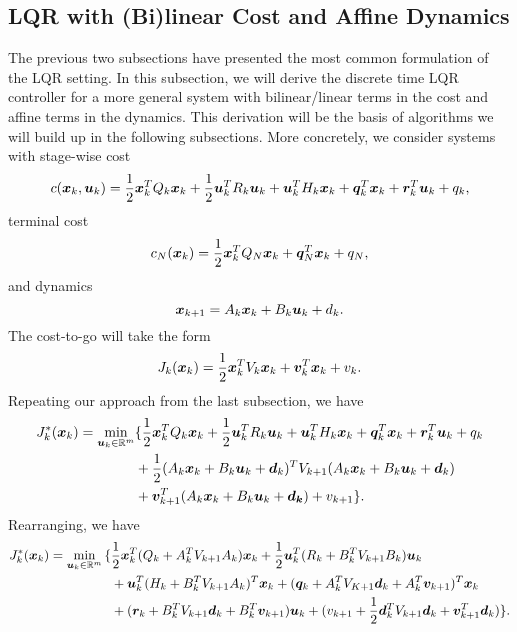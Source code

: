 \subsection{LQR with (Bi)linear Cost and Affine Dynamics}

The previous two subsections have presented the most common formulation of the LQR setting. In this subsection, we will derive the discrete time LQR controller for a more general system with bilinear/linear terms in the cost and affine terms in the dynamics. This derivation will be the basis of algorithms we will build up in the following subsections. More concretely, we consider systems with stage-wise cost
\begin{equation}
    c(\bm{x}_k, \bm{u}_k) = \frac{1}{2} \bm{x}_k^T Q_k \bm{x}_k + \frac{1}{2} \bm{u}_k^T R_k \bm{u}_k + \bm{u}_k^T H_k \bm{x}_k +\bm{q}_k^T \bm{x}_k + \bm{r}^T_k \bm{u}_k + q_k,
\end{equation}
terminal cost
\begin{equation}
    c_N(\bm{x}_k) = \frac{1}{2} \bm{x}_k^T Q_N \bm{x}_k + \bm{q}_N^T \bm{x}_k + q_N,
\end{equation}
and dynamics
\begin{equation}
    \bm{x}_{k+1} = A_k \bm{x}_k + B_k \bm{u}_k + d_k.
\end{equation}
The cost-to-go will take the form 
\begin{equation}
    J_k(\bm{x}_k) = \frac{1}{2}\bm{x}_k^T V_k \bm{x}_k + \bm{v}_k^T \bm{x}_k + v_k.
\end{equation} 
Repeating our approach from the last subsection, we have
\begin{align}
\label{eq:LQR_rec_cost2}
    J_{k}^*(\bm{x}_{k}) =  \min_{\bm{u}_{k} \in \mathbb{R}^m} & {\large\{} 
    \frac{1}{2} \bm{x}_{k}^T Q_{k} \bm{x}_{k} + \frac{1}{2} \bm{u}_{k}^T R_{k} \bm{u}_{k} + \bm{u}_k^T H_k \bm{x}_k +\bm{q}_k^T \bm{x}_k + \bm{r}^T_k \bm{u}_k + q_k \\
    &+ \frac{1}{2} (A_{k} \bm{x}_{k} + B_{k} \bm{u}_{k} + \bm{d}_k)^T V_{k+1} (A_{k} \bm{x}_{k} + B_{k} \bm{u}_{k} + \bm{d}_k) \nonumber \\
    & + \bm{v}^T_{k+1} (A_{k} \bm{x}_{k} + B_{k} \bm{u}_{k} + \bm{d_k}) + v_{k+1} {\large\}}. \nonumber
\end{align}
Rearranging, we have
\begin{align}
    J_{k}^*(\bm{x}_{k}) = \min_{\bm{u}_{k} \in \mathbb{R}^m} {\Large\{}  
    & \frac{1}{2} \bm{x}_k^T (Q_k + A_k^T V_{k+1} A_k) \bm{x}_k + \frac{1}{2} \bm{u}_k^T (R_k + B_k^T V_{k+1} B_k) \bm{u}_k\\
    & + \bm{u}_k^T (H_k + B_k^T V_{k+1} A_k)^T \bm{x}_k + (\bm{q}_k + A_k^T V_{K+1} \bm{d}_k + A_k^T \bm{v}_{k+1})^T \bm{x}_k \nonumber \\
    & + (\bm{r}_k + B_k^T V_{k+1} \bm{d}_k + B_k^T \bm{v}_{k+1}) \bm{u}_k + (v_{k+1} + \frac{1}{2} \bm{d}_k^T V_{k+1} \bm{d}_k + \bm{v}_{k+1}^T \bm{d}_k) \nonumber
    {\Large\}}.
\end{align}
